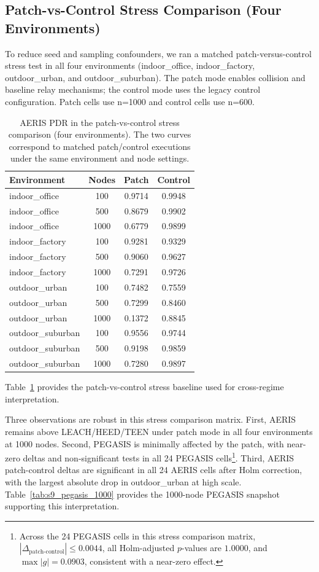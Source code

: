 ﻿\documentclass[sensors,article,submit,moreauthors,pdftex]{Definitions/mdpi}
\begin{document}
\subsection{Patch-vs-Control Stress Comparison (Four Environments)}
To reduce seed and sampling confounders, we ran a matched patch-versus-control stress test in all four environments (indoor\_office, indoor\_factory, outdoor\_urban, and outdoor\_suburban). The patch mode enables collision and baseline relay mechanisms; the control mode uses the legacy control configuration. Patch cells use n=1000 and control cells use n=600.

\begin{table}[H]
\caption{AERIS PDR in the patch-vs-control stress comparison (four environments). The two curves correspond to matched patch/control executions under the same environment and node settings.}
\label{tab:s9_patch_control}
\centering
\begin{tabular}{lccc}
\toprule
Environment & Nodes & Patch & Control \\
\midrule
indoor\_office & 100  & 0.9714 & 0.9948 \\
indoor\_office & 500  & 0.8679 & 0.9902 \\
indoor\_office & 1000 & 0.6779 & 0.9899 \\
indoor\_factory & 100  & 0.9281 & 0.9329 \\
indoor\_factory & 500  & 0.9060 & 0.9627 \\
indoor\_factory & 1000 & 0.7291 & 0.9726 \\
outdoor\_urban & 100  & 0.7482 & 0.7559 \\
outdoor\_urban & 500  & 0.7299 & 0.8460 \\
outdoor\_urban & 1000 & 0.1372 & 0.8845 \\
outdoor\_suburban & 100  & 0.9556 & 0.9744 \\
outdoor\_suburban & 500  & 0.9198 & 0.9859 \\
outdoor\_suburban & 1000 & 0.7280 & 0.9897 \\
\bottomrule
\end{tabular}
\end{table}

Table~\ref{tab:s9_patch_control} provides the patch-vs-control stress baseline used for cross-regime interpretation.

Three observations are robust in this stress comparison matrix. First, AERIS remains above LEACH/HEED/TEEN under patch mode in all four environments at 1000 nodes. Second, PEGASIS is minimally affected by the patch, with near-zero deltas and non-significant tests in all 24 PEGASIS cells\footnote{Across the 24 PEGASIS cells in this stress comparison matrix, \(|\Delta_{\text{patch-control}}| \le 0.0044\), all Holm-adjusted \(p\)-values are \(1.0000\), and \(\max |g| = 0.0903\), consistent with a near-zero effect.}. Third, AERIS patch-control deltas are significant in all 24 AERIS cells after Holm correction, with the largest absolute drop in outdoor\_urban at high scale. Table~\ref{tab:s9_pegasis_1000} provides the 1000-node PEGASIS snapshot supporting this interpretation.
\end{document}
